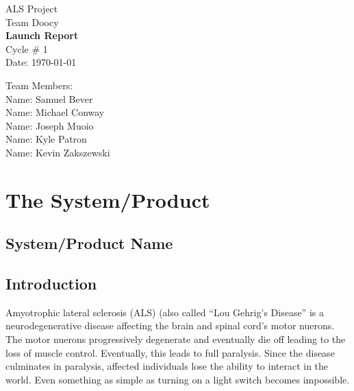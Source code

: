 \documentclass{report}
\begin{document}
\begin{titlepage}
    \begin{center}
        \begin{huge}
        ALS Project \\[1cm]
        Team Doocy \\[2.2cm]
        { \bfseries Launch Report } \\[1cm]
        Cycle \# 1\\[2.2cm]
        Date: \required\today\\[1cm]
        \end{huge}
    \end{center}
    \null \vfill
    \begin{large}
        Team Members: \\[0.5cm]
        Name: Samuel Bever\\[0.5cm]
        Name: Michael Conway\\[0.5cm]
        Name: Joseph Muoio\\[0.5cm]
        Name: Kyle Patron\\[0.5cm]
        Name: Kevin Zakszewski
    \end{large}
\end{titlepage}

\section*{\centering The System/Product}

\subsection*{System/Product Name}


\subsection*{Introduction}

Amyotrophic lateral sclerosis (ALS) (also called ``Lou Gehrig's Disease'' is a neurodegenerative disease affecting the brain and spinal cord's motor nuerons. The motor nuerons progressively degenerate and eventually die off leading to the loss of muscle control. Eventually, this leads to full paralysis. Since the disease culminates in paralysis, affected individuals lose the ability to interact in the world. Even something as simple as turning on a light switch becomes impossible.
\end{document}
